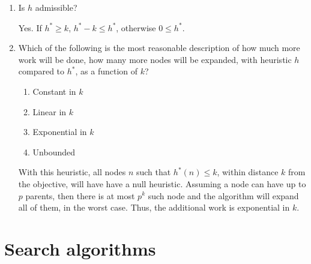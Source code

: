 \documentclass[11pt, a4paper]{article}
\begin{document}
\begin{enumerate}
    \item Is $h$ admissible?
    
    \begin{solution}
        Yes. If $h^* \geq k$, $h^* - k \leq h^*$, otherwise $0 \leq h^*$.
    \end{solution}
    
    \item Which of the following is the most reasonable description of how much more work will be done, \ie{} how many more nodes will be expanded, with heuristic $h$ compared to $h^*$, as a function of $k$?
    
    \begin{enumerate}
        \item Constant in $k$
        \item Linear in $k$
        \item Exponential in $k$
        \item Unbounded
    \end{enumerate}
    
    \begin{solution}
        With this heuristic, all nodes $n$ such that $h^*(n) \leq k$, \ie{} within distance $k$ from the objective, will have have a null heuristic. Assuming a node can have up to $p$ parents, then there is at most $p^k$ such node and the algorithm will expand all of them, in the worst case. Thus, the additional work is exponential in $k$.
    \end{solution}
\end{enumerate}

\newpage

\section{Search algorithms}

\begin{center}
\end{center}
\end{document}
